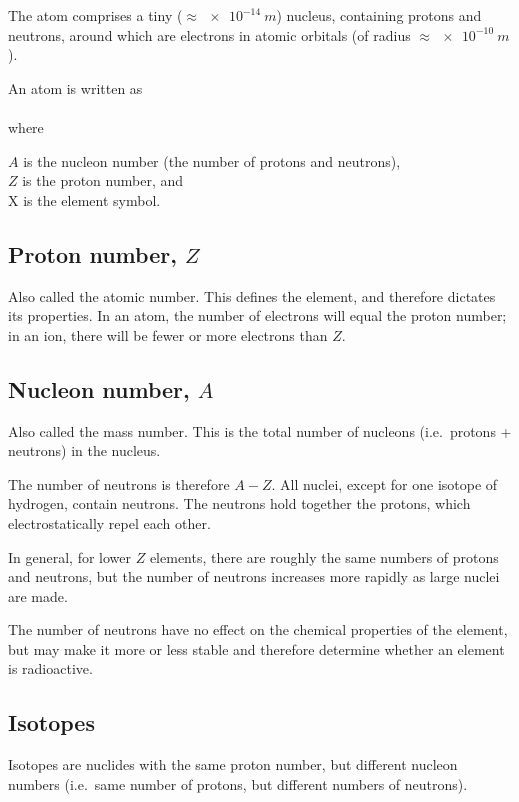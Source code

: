 \documentclass[a4paper,12pt]{article}
\begin{document}
The atom comprises a tiny ($\approx \SI{e-14}{m}$) nucleus, containing protons and neutrons, around which are electrons in atomic orbitals (of radius $\approx \SI{e-10}{m}$).

An atom is written as\\

{\huge {}}\\

where \begin{minipage}[t]{12cm}$A$ is the nucleon number (the number of protons and neutrons),\\
$Z$ is the proton number, and\\
X is the element symbol.\end{minipage}

\subsection{Proton number, $Z$}

Also called the atomic number.  This defines the element, and therefore dictates its properties.  In an atom, the number of electrons will equal the proton number; in an ion, there will be fewer or more electrons than $Z$.

\subsection{Nucleon number, $A$}

Also called the mass number.  This is the total number of nucleons (i.e.\ protons + neutrons) in the nucleus.

The number of neutrons is therefore $A-Z$.  All nuclei, except for one isotope of hydrogen, contain neutrons.  The neutrons hold together the protons, which electrostatically repel each other.

In general, for lower $Z$ elements, there are roughly the same numbers of protons and neutrons, but the number of neutrons increases more rapidly as large nuclei are made.

The number of neutrons have no effect on the chemical properties of the element, but may make it more or less stable and therefore determine whether an element is radioactive.

\subsection{Isotopes}

Isotopes are nuclides with the same proton number, but different nucleon numbers (i.e.\ same number of protons, but different numbers of neutrons).
\end{document}
